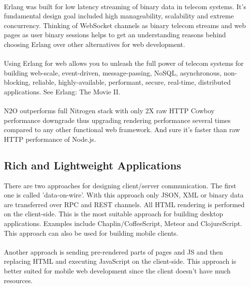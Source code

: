 
\paragraph{}
Erlang was built for low latency streaming of binary data in telecom systems.
It's fundamental design goal included high manageability, scalability
and extreme concurrency. Thinking of WebSocket channels as binary
telecom streams and web pages as user binary sessions
helps to get an understanding reasons behind choosing Erlang
over other alternatives for web development.

\paragraph{}
Using Erlang for web allows you to unleash the full power of telecom systems for
building web-scale, event-driven, message-passing, NoSQL, asynchronous, non-blocking,
reliable, highly-available, performant, secure, real-time, distributed applications.
See Erlang: The Movie II.

\paragraph{}
N2O outperforms full Nitrogen stack with only 2X raw HTTP Cowboy
performance downgrade thus upgrading rendering performance several
times compared to any other functional web framework. And
sure it's faster than raw HTTP performance of Node.js.

\subsection{Rich and Lightweight Applications}
There are two approaches for designing client/server communication.
The first one is called 'data-on-wire'. With this approach only JSON, XML or binary
data are transferred over RPC and REST channels. All HTML rendering
is performed on the client-side. This is the most suitable approach for building desktop
applications. Examples include Chaplin/CoffeeScript, Meteor
and ClojureScript. This approach can also be used for building mobile clients.

\paragraph{}
Another approach is sending pre-rendered parts of pages and JS
and then replacing HTML and executing JavaScript on the client-side. This approach
is better suited for mobile web development since the
client doesn't have much resources.


